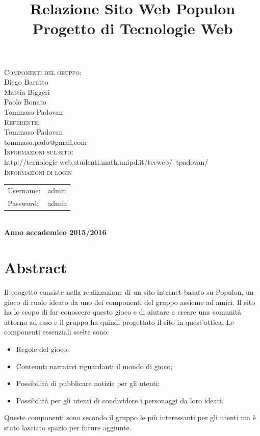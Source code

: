 \documentclass{article}
\title{Relazione Sito Web Populon \\ Progetto di Tecnologie Web} %
\begin{document}
\maketitle %

\begin{center}
\textsc{\LARGE Componenti del gruppo:}\\[0.2cm]
 Diego Baratto \\ %
Mattia Biggeri \\
Paolo Bonato \\
Tommaso Padovan \\[0.2cm]
\textsc{\LARGE Referente:}\\[0.2cm]
 Tommaso Padovan\\
 tommaso.pado@gmail.com\\[0.2cm]
 \textsc{\LARGE Informazioni sul sito:}\\ [0.2cm]
http://tecnologie-web.studenti.math.unipd.it/tecweb/~tpadovan/\\[0.2cm]
\textsc{\LARGE Informazioni di login}\\[0.2cm]

\begin{tabular}{l r} 
 Username: & admin\\
 Password: & admin\\
\end{tabular}\\[0.2cm]
\textbf{Anno accademico 2015/2016}
\end{center}

\newpage
\tableofcontents %
\newpage

 \newpage

\section{Abstract}
	Il progetto consiste nella realizzazione di un sito internet basato su Populon, un gioco di ruolo ideato da uno dei
	componenti del gruppo assieme ad amici. Il sito ha lo scopo di far conoscere questo gioco e di aiutare a creare una comunità
	attorno ad esso e il gruppo ha quindi progettato il sito in quest'ottica. Le componenti essenziali scelte sono:
	\begin{itemize}
		\item Regole del gioco;
		\item Contenuti narrativi riguardanti il mondo di gioco;
		\item Possibilità di pubblicare notizie per gli utenti;
		\item Possibilità per gli utenti di condividere i personaggi da loro ideati.	
	\end{itemize}
	Queste componenti sono secondo il gruppo le più interessanti per gli utenti ma è stato lasciato spazio per future aggiunte.
	
\end{document}
